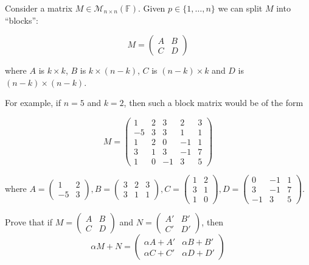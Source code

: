 \documentclass{article}
\theoremstyle{plain} %
\numberwithin{thm}{section} %
\theoremstyle{definition}
\begin{document}
    \begin{question}{6}
        Consider a matrix \( M \in \mathcal{M}_{n \times n}(\mathbb{F}) \). Given \( p \in \{1, \ldots, n\} \) we can split \( M \) into “blocks”: 
        
        \[
        M = \left( \begin{array}{c|c}
            A & B \\
            \hline
            C & D
        \end{array} \right) 
        \]
        
        where \( A \) is \( k \times k \), \( B \) is \( k \times (n-k) \), \( C \) is \( (n-k) \times k \) and \( D \) is \( (n-k) \times (n-k) \).
        
        For example, if \( n = 5 \) and \( k = 2 \), then such a block matrix would be of the form
        
        \[
        M = \left(\begin{array}{cc|ccc} 
        1 & 2 & 3 & 2 & 3 \\ 
        -5 & 3 & 3 & 1 & 1 \\
        \hline 
        1 & 2 & 0 & -1 & 1 \\ 
        3 & 1 & 3 & -1 & 7 \\ 
        1 & 0 & -1 & 3 & 5 
        \end{array}\right)
        \]
        
        where \( A = \begin{pmatrix} 
        1 & 2 \\
        -5 & 3 
        \end{pmatrix}, B = \begin{pmatrix} 
        3 & 2 & 3 \\ 
        3 & 1 & 1 
        \end{pmatrix}, C = \begin{pmatrix} 
        1 & 2 \\ 
        3 & 1 \\ 
        1 & 0 
        \end{pmatrix}, D = \begin{pmatrix} 
        0 & -1 & 1 \\ 
        3 & -1 & 7 \\ 
        -1 & 3 & 5 
        \end{pmatrix} \).
        
        Prove that if \( M = \left(\begin{array}{c|c} 
        A & B \\ 
        \hline
        C & D 
        \end{array}\right) \) and \( N = \left(\begin{array}{c|c} 
        A' & B' \\
        \hline
        C' & D' 
        \end{array}\right) \), then
        \[ \alpha M + N = \left(\begin{array}{c|c}
        \alpha A + A' & \alpha B + B' \\
        \hline
        \alpha C + C' & \alpha D + D' 
        \end{array}\right) \]


\end{question}
\end{document}
